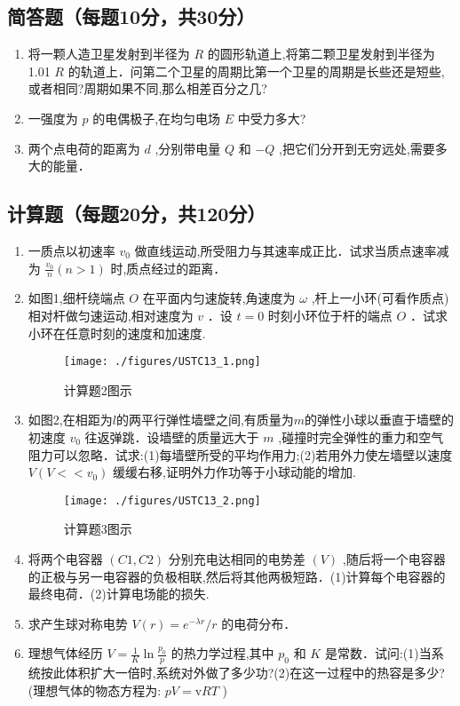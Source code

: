 

\subsection{ 简答题（每题10分，共30分）}
\begin{enumerate}
\item 将一颗人造卫星发射到半径为 $R$ 的圆形轨道上,将第二颗卫星发射到半径为1.01 $R$ 的轨道上．问第二个卫星的周期比第一个卫星的周期是长些还是短些,或者相同?周期如果不同,那么相差百分之几?

\item 一强度为 $p$ 的电偶极子,在均匀电场 $E$ 中受力多大?

\item 两个点电荷的距离为 $d$ ,分别带电量 $Q$ 和 $-Q$ ,把它们分开到无穷远处,需要多大的能量．
\end{enumerate}
\subsection{计算题（每题20分，共120分）}
\begin{enumerate}
\item 一质点以初速率 $v_0$ 做直线运动,所受阻力与其速率成正比．试求当质点速率减为 $\frac{v_0}{n}(n>1)$ 时,质点经过的距离．

\item 如图1,细杆绕端点 $O$ 在平面内匀速旋转,角速度为 $\omega$ ,杆上一小环(可看作质点)相对杆做匀速运动,相对速度为 $v$ ．设 $t=0$ 时刻小环位于杆的端点 $O$ ．试求小环在任意时刻的速度和加速度.\\
\begin{figure}[ht]
\centering
\texttt{[image: ./figures/USTC13\_1.png]}
\caption{计算题2图示} \label{USTC13_fig1}
\end{figure}

\item 如图2,在相距为$l$的两平行弹性墙壁之间,有质量为$m$的弹性小球以垂直于墙壁的初速度 $v_0$ 往返弹跳．设墙壁的质量远大于 $m$ ,碰撞时完全弹性的重力和空气阻力可以忽略．试求:(1)每墙壁所受的平均作用力;(2)若用外力使左墙壁以速度 $V(V<<v_0)$ 缓缓右移,证明外力作功等于小球动能的增加.\\
\begin{figure}[ht]
\centering
\texttt{[image: ./figures/USTC13\_2.png]}
\caption{计算题3图示} \label{USTC13_fig2}
\end{figure}

\item 将两个电容器 $(C1,C2)$ 分别充电达相同的电势差 $(V)$ ,随后将一个电容器的正极与另一电容器的负极相联,然后将其他两极短路．(1)计算每个电容器的最终电荷．(2)计算电场能的损失.

\item 求产生球对称电势 $V(r)=e^{-\lambda r}/r$ 的电荷分布．

\item 理想气体经历 $V=\frac{1}{K} \ln \frac{p_{0}}{p}$ 的热力学过程,其中 $p_0$ 和 $K$ 是常数．试问:(1)当系统按此体积扩大一倍时,系统对外做了多少功?(2)在这一过程中的热容是多少?(理想气体的物态方程为: $pV=\mathrm v RT$ )
\end{enumerate}
